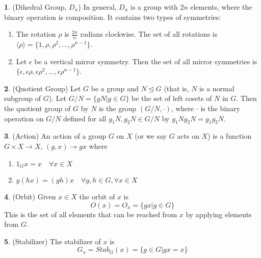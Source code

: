 \documentclass[12pt]{article}
\theoremstyle{definition}
\newtheorem{definition}{\color{NavyBlue}{\textbf{Definition}}}
\newcommand{\e}{\epsilon}
\begin{document}
\begin{definition}(Dihedral Group, $D_n$)
In general, $D_n$ is a group with $2n$ elements, where the binary operation is composition. It contains two types of symmetries:
\begin{enumerate}
\item The rotation $\rho$ is $\frac{2\pi}{n}$ radians clockwise. The set of all rotations is $\langle \rho \rangle = \{1, \rho, \rho^2, \ldots, \rho^{n-1} \}$.
\item Let $\e$ be a vertical mirror symmetry. Then the set of all mirror symmetries is $\{\e, \e\rho, \e\rho^2, \ldots, \e \rho^{n-1} \}$.
\end{enumerate}
\end{definition}

\begin{definition}(Quotient Group)
Let $G$ be a group and $N \trianglelefteq G$ (that is, $N$ is a normal subgroup of $G$). Let $G/N = \{gN|g \in G\}$ be the set of left cosets of $N$ in $G$. Then the quotient group of $G$ by $N$ is the group $(G/N, \cdot)$, where $\cdot$ is the binary operation on $G/N$ defined for all $g_1 N, g_2 N \in G / N$ by $g_1 N g_2 N = g_1g_2N$.
\end{definition}

\begin{definition}(Action)
An action of a group $G$ on $X$ (or we say $G$ acts on $X$) is a function $G \times X \to X$, $(g,x) \to gx$ where
\begin{enumerate}
\item $1_G x = x \quad \forall x \in X$
\item $g(hx) = (gh)x \quad \forall g,h \in G, \forall x \in X$
\end{enumerate}
\end{definition}

\begin{definition}(Orbit)
Given $x \in X$ the orbit of $x$ is
\begin{equation}
O(x) = O_x = \{gx | g \in G\}
\end{equation}
This is the set of all elements that can be reached from $x$ by applying elements from $G$.
\end{definition}

\begin{definition}(Stabilizer)
The stabilizer of $x$ is
\begin{equation}
G_x = Stab_G(x) = \{ g\in G | gx = x \}
\end{equation}
\end{definition}
\end{document}
